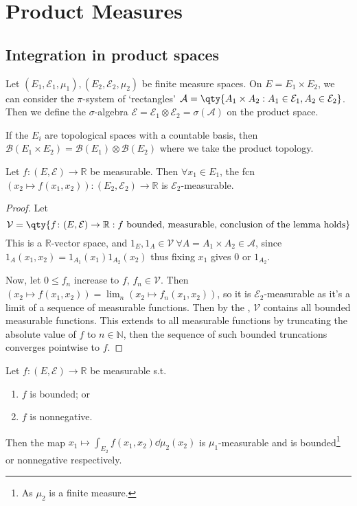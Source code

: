 \section{Product Measures}
\subsection{Integration in product spaces}
Let $(E_1, \mathcal E_1, \mu_1), (E_2, \mathcal E_2, \mu_2)$ be finite measure spaces.
On $E = E_1 \times E_2$, we can consider the $\pi$-system of `rectangles' $\mathcal A = \qty{A_1 \times A_2 : A_1 \in \mathcal E_1, A_2 \in \mathcal E_2}$.
Then we define the $\sigma$-algebra $\mathcal{E} = \mathcal E_1 \otimes \mathcal E_2 = \sigma(\mathcal A)$ on the product space.

If the $E_i$ are topological spaces with a countable basis, then $\mathcal B(E_1 \times E_2) = \mathcal B(E_1) \otimes \mathcal B(E_2)$ where we take the product topology.

\begin{lemma}
	Let $f \colon (E, \mathcal E) \to \mathbb R$ be measurable.
	Then $\forall x_1 \in E_1$, the fcn $(x_2 \mapsto f(x_1, x_2)) \colon (E_2, \mathcal E_2) \to \mathbb R$ is $\mathcal E_2$-measurable.
\end{lemma}

\begin{proof}
	Let
	\[ \mathcal V = \qty{f \colon (E,\mathcal E) \to \mathbb R : f \text{ bounded, measurable, conclusion of the lemma holds}} \]
	This is a $\mathbb R$-vector space, and $1_E, 1_A \in \mathcal{V} \ \forall A = A_1 \times A_2 \in \mathcal A$, since $1_A(x_1, x_2) = 1_{A_1}(x_1) 1_{A_2}(x_2)$ thus fixing $x_1$ gives $0$ or $1_{A_2}$.

	Now, let $0 \leq f_n$ increase to $f$, $f_n \in \mathcal V$.
	Then $(x_2 \mapsto f(x_1, x_2)) = \lim_n (x_2 \mapsto f_n(x_1, x_2))$, so it is $\mathcal E_2$-measurable as it's a limit of a sequence of measurable functions.
	Then by the , $\mathcal V$ contains all bounded measurable functions.
	This extends to all measurable functions by truncating the absolute value of $f$ to $n \in \mathbb N$, then the sequence of such bounded truncations converges pointwise to $f$.
\end{proof}

\begin{lemma} \label{lem:4-2}
	Let $f \colon (E, \mathcal E) \to \mathbb R$ be measurable s.t.
	\begin{enumerate}
		\item $f$ is bounded; or
		\item $f$ is nonnegative.
	\end{enumerate}
	Then the map $x_1 \mapsto \int_{E_2} f(x_1,x_2) \dd{\mu_2(x_2)}$ is $\mu_1$-measurable and is bounded\footnote{As $\mu_2$ is a finite measure.} or nonnegative respectively.
\end{lemma}


